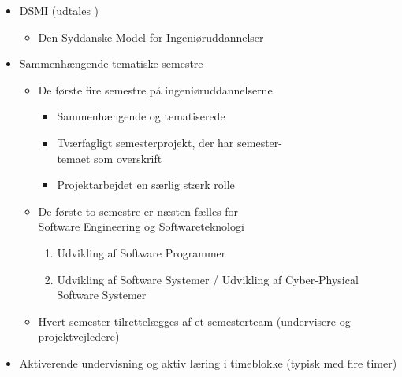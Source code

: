 {\begin{frame}[fragile]
  \vspace{0mm}
  \begin{itemize}
    \pause
    \item DSMI (udtales )
      \begin{itemize}
        \item Den Syddanske Model for Ingeniøruddannelser
      \end{itemize}
    \pause
    \item Sammenhængende tematiske semestre
      \begin{itemize}
        \item De første fire semestre på ingeniøruddannelserne
          \begin{itemize}
            \item Sammenhængende og tematiserede
            \item Tværfagligt semesterprojekt, der har semester-\\temaet som overskrift
            \item Projektarbejdet en særlig stærk rolle
          \end{itemize}
        \item De første to semestre er næsten fælles for\\Software Engineering og Softwareteknologi
          \begin{enumerate}
            \item Udvikling af Software Programmer
            \item Udvikling af Software Systemer / Udvikling af Cyber-Physical Software Systemer
          \end{enumerate}
        \item Hvert semester tilrettelægges af et semesterteam (undervisere og projektvejledere)
      \end{itemize}
    \pause
    \item Aktiverende undervisning og aktiv læring i timeblokke (typisk med fire timer)
  \end{itemize}
\end{frame}

}


